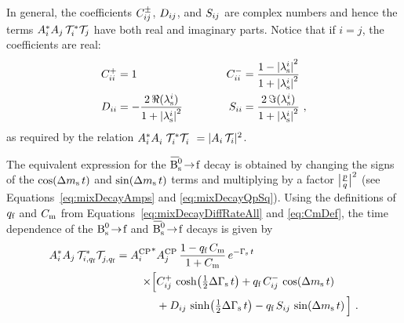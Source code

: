 In general, the coefficients $\Cf[ij]^\pm$, $\Df[ij]$, and $\Sf[ij]$ are complex numbers and hence the terms
$\Ai^*\Ai[j]\,\timeAmp^*\timeAmp[j]$ have both real and imaginary parts. Notice that if $i=j$, the coefficients are real:
\begin{equation}
  \begin{alignedat}{2}
    \Cf[ii]^+ &= 1                                                    &  \Cf[ii]^- &= \frac{1-\lamsiSq}{1+\lamsiSq} \\
    \Df[ii]   &= -\frac{2\,\Re(\lamsi)}{1+\lamsiSq} \qquad\qquad  &  \Sf[ii]   &= \frac{2\,\Im(\lamsi)}{1+\lamsiSq} \ ,
  \end{alignedat}
\end{equation}
as required by the relation $\Ai^*\Ai^{\phantom{*}}\,\timeAmp^*\timeAmp^{\phantom{*}} = |\Ai\,\timeAmp|^2$.

The equivalent expression for the $\Bsbartof$ decay is obtained by changing the signs of the $\cDms$ and $\sDms$ terms and multiplying
by a factor $\pqAbsAlt^\text{2}$ (see Equations~\ref{eq:mixDecayAmps} and \ref{eq:mixDecayQpSq}). Using the definitions of $\qf$ and
$\Cm$ from Equations~\ref{eq:mixDecayDiffRateAll} and \ref{eq:CmDef}, the time dependence of the $\Bstof$ and $\Bsbartof$ decays is
given by
\begin{equation}
  \label{eq:timeqfDep}
  \begin{aligned}
    \Ai^*\Ai[j]\,\timeAmp[i,\qf]^*\timeAmp[j,\qf]^{\phantom{*}} =
      \AAvConj&\AAv[{\Ai[j]}]\, \frac{1-\qf\,\Cm}{1+\Cm}\, \eGst \\
          \times\Big[ &\Cf[ij]^+\,\cDGs + \qf\,\Cf[ij]^-\,\cDms \\
                      &+ \Df[ij]\,\sDGs - \qf\,\Sf[ij]\,\sDms \Big] \ .
  \end{aligned}
\end{equation}


